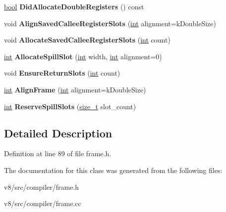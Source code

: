 \begin{DoxyCompactItemize}
\mbox{\hyperlink{classbool}{bool}} {\bfseries Did\+Allocate\+Double\+Registers} () const
\item 
\mbox{\label{classv8_1_1internal_1_1compiler_1_1Frame_addcec30d9bd94de8f64e507d0c61e91d}} 
void {\bfseries Align\+Saved\+Callee\+Register\+Slots} (\mbox{\hyperlink{classint}{int}} alignment=k\+Double\+Size)
\item 
\mbox{\label{classv8_1_1internal_1_1compiler_1_1Frame_a4e64d39cd47e6a1761f353367648a6e0}} 
void {\bfseries Allocate\+Saved\+Callee\+Register\+Slots} (\mbox{\hyperlink{classint}{int}} count)
\item 
\mbox{\label{classv8_1_1internal_1_1compiler_1_1Frame_a88d31ef621d20d428a8af4ad1773acdd}} 
\mbox{\hyperlink{classint}{int}} {\bfseries Allocate\+Spill\+Slot} (\mbox{\hyperlink{classint}{int}} width, \mbox{\hyperlink{classint}{int}} alignment=0)
\item 
\mbox{\label{classv8_1_1internal_1_1compiler_1_1Frame_a4446dbe2511c4877685de0e6b8c3428a}} 
void {\bfseries Ensure\+Return\+Slots} (\mbox{\hyperlink{classint}{int}} count)
\item 
\mbox{\label{classv8_1_1internal_1_1compiler_1_1Frame_ae75e2c220522bf150ba87b81b5bb0433}} 
\mbox{\hyperlink{classint}{int}} {\bfseries Align\+Frame} (\mbox{\hyperlink{classint}{int}} alignment=k\+Double\+Size)
\item 
\mbox{\label{classv8_1_1internal_1_1compiler_1_1Frame_a3b2080967bb6f7ed3bdbae804ccbbefd}} 
\mbox{\hyperlink{classint}{int}} {\bfseries Reserve\+Spill\+Slots} (\mbox{\hyperlink{classsize__t}{size\+\_\+t}} slot\+\_\+count)
\end{DoxyCompactItemize}


\subsection{Detailed Description}


Definition at line 89 of file frame.\+h.



The documentation for this class was generated from the following files\+:\begin{DoxyCompactItemize}
\item 
v8/src/compiler/frame.\+h\item 
v8/src/compiler/frame.\+cc\end{DoxyCompactItemize}
